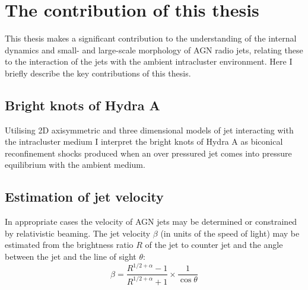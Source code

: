 \section{The contribution of this thesis}\label{int:con}

This thesis makes a significant contribution to the understanding of the internal dynamics and small- and large-scale morphology of AGN radio jets, relating these to the interaction of the jets with the ambient intracluster environment. Here I briefly describe the key contributions of this thesis. 



\subsection{Bright knots of Hydra A}  
Utilising 2D axisymmetric and three dimensional models of jet interacting with the intracluster medium I interpret the bright knots of Hydra A as biconical reconfinement shocks produced when an over pressured jet comes into pressure equilibrium with the ambient medium. 


\subsection{Estimation of jet velocity}
In appropriate cases the velocity of AGN jets may be determined or constrained by relativistic beaming.  The jet velocity $\beta$ (in units of the speed of light) may be estimated from the brightness ratio $R$ of the jet to counter jet and the angle between the jet and the line of sight $\theta$:
\begin{equation}
\beta = \frac{R^{1/2+\alpha}-1}{R^{1/2+\alpha}+1}\times \frac{1}{\cos \theta}
\label{eq:db}
\end{equation}

